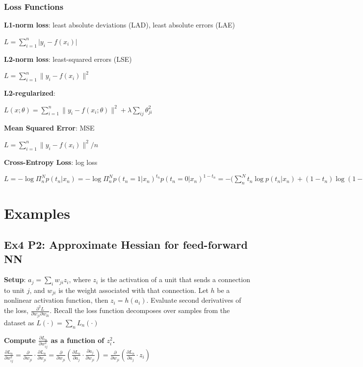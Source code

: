 \subsubsection*{Loss Functions}
\textbf{L1-norm loss}: least absolute deviations (LAD), least absolute errors (LAE) 

\tab $L=\sum^n_{i=1} \lvert y_i - f(x_i) \rvert$

\textbf{L2-norm loss}: least-squared errors (LSE)

\tab $L=\sum^n_{i=1} \lVert y_i - f(x_i) \rVert^2$

\textbf{L2-regularized}:

\tab $L(x;\theta)=\sum^n_{i=1} \lVert y_i - f(x_i;\theta) \rVert^2 + \lambda\sum_{ij}\theta_{ji}^2$

\textbf{Mean Squared Error}: MSE

\tab $L=\sum^n_{i=1} \lVert y_i - f(x_i) \rVert^2 / n$

\textbf{Cross-Entropy Loss}: log loss

$L=-\log\Pi^N_n p(t_n|x_n)=-\log\Pi^N_n p(t_n=1|x_n)^{t_n} p(t_n=0|x_n)^{1-t_n}=-\bigr(\sum^N_n t_n \log p(t_n|x_n) + (1-t_n) \log (1-p(t_n|x_n))\bigr)$



\section*{Examples}
\subsection*{Ex4 P2: Approximate Hessian for feed-forward NN}
\textbf{Setup}: $a_j=\sum\limits_i w_{ji}z_i$, where $z_i$ is the activation of a unit that sends a connection to unit $j$, and $w_{ji}$ is the weight associated with that connection. Let $h$ be a nonlinear activation function, then $z_i=h(a_i)$. Evaluate second derivatives of the loss, $\frac{\partial^2 L}{\partial w_{ji} \partial w_{lk}}$. Recall the loss function decomposes over samples from the dataset as $L(\cdot)=\sum_n L_n(\cdot)$

\textbf{Compute $\frac{\partial L_n}{\partial w^2_{ij}}$ as a function of $z^2_i$.}\\

\tab$\frac{\partial L_n}{\partial w^2_{ij}}=\frac{\partial}{\partial w_{ji}}\cdot \frac{\partial L_n}{\partial w_{ji}}=\frac{\partial}{\partial w_{ji}}(\frac{\partial L_n}{\partial a_j}\cdot\frac{\partial a_j}{\partial w_{ji}})=\frac{\partial}{\partial w_{ji}}(\frac{\partial L_n}{\partial a_j}\cdot z_i)$\\

